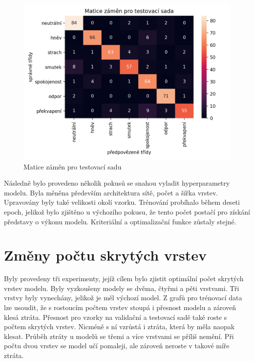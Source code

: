 \documentclass[FM,BP]{tulthesis}
\begin{document}
\begin{figure}[!htbp]
\centerline{\includegraphics[scale=.5]{baseline-conf_matrix-test.png}}
\caption{Matice záměn pro testovací sadu}
\label{fig}
\end{figure}
\FloatBarrier

Následně bylo provedeno několik pokusů se snahou vyladit hyperparametry modelu. Byla měněna především architektura sítě, počet a šířka vrstev. Upravovány byly také velikosti okolí vzorku. Trénování probíhalo během deseti epoch, jelikož bylo zjištěno u výchozího pokusu, že tento počet postačí pro získání představy o výkonu modelu. Kriteriální a optimalizační funkce zůstaly stejné.

\section{Změny počtu skrytých vrstev} %
Byly provedeny tři experimenty, jejíž cílem bylo zjistit optimální počet skrytých vrstev modelu. Byly vyzkoušeny modely se dvěma, čtyřmi a pěti vrstvami. Tři vrstvy byly vynechány, jelikož je měl výchozí model. Z grafů pro trénovací data lze usoudit, že s rostoucím počtem vrstev stoupá i přesnost modelu a zároveň klesá ztráta. Přesnost pro vzorky na validační a testovací sadě také roste s počtem skrytých vrstev. Nicméně s ní vzrůstá i ztráta, která by měla naopak klesat. Průběh ztráty u modelů se třemi a více vrstvami se příliš nemění. Při počtu dvou vrstev se model učí pomaleji, ale zároveň neroste v takové míře ztráta.
\end{document}

